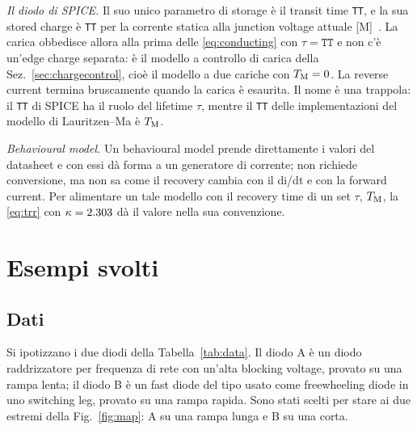 \documentclass[10pt,a4paper]{scrartcl}
\let\newcommand\pdvaluedefine
\newcommand{\TM}{T_\mathrm{M}}
\begin{document}
\emph{Il diodo di SPICE.} Il suo unico parametro di storage è il transit time \texttt{TT}, e la sua stored charge è \texttt{TT} per la corrente statica alla junction voltage attuale [M]~\cite{nagel1975}. La carica obbedisce allora alla prima delle \eqref{eq:conducting} con $\tau = \texttt{TT}$ e non c'è un'edge charge separata: è il modello a controllo di carica della Sez.~\ref{sec:chargecontrol}, cioè il modello a due cariche con $\TM = 0$. La reverse current termina bruscamente quando la carica è esaurita. Il nome è una trappola: il \texttt{TT} di SPICE ha il ruolo del lifetime $\tau$, mentre il \texttt{TT} delle implementazioni del modello di Lauritzen--Ma è $\TM$.

\emph{Behavioural model.} Un behavioural model prende direttamente i valori del datasheet e con essi dà forma a un generatore di corrente; non richiede conversione, ma non sa come il recovery cambia con il di/dt e con la forward current. Per alimentare un tale modello con il recovery time di un set $\tau$, $\TM$, la \eqref{eq:trr} con $\kappa = 2.303$ dà il valore nella sua convenzione.

\section{Esempi svolti}
\label{sec:examples}
\subsection{Dati}
Si ipotizzano i due diodi della Tabella~\ref{tab:data}. Il diodo A è un diodo raddrizzatore per frequenza di rete con un'alta blocking voltage, provato su una rampa lenta; il diodo B è un fast diode del tipo usato come freewheeling diode in uno switching leg, provato su una rampa rapida. Sono stati scelti per stare ai due estremi della Fig.~\ref{fig:map}: A su una rampa lunga e B su una corta.
\end{document}
